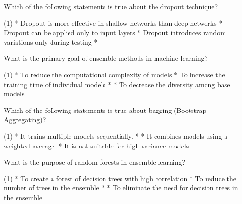\documentclass[11pt]{extarticle}
\begin{document}
\begin{exercise}
    Which of the following statements is true about the dropout technique?
    \begin{choice} (1)
        * Dropout is more effective in shallow networks than deep networks
        * Dropout can be applied only to input layers
        * Dropout introduces random variations only during testing
        * 
    \end{choice}
\end{exercise}
\begin{solution}
\end{solution}

\begin{exercise}
    What is the primary goal of ensemble methods in machine learning?
    \begin{choice}(1)
        * To reduce the computational complexity of models
        * To increase the training time of individual models
        * 
        * To decrease the diversity among base models
    \end{choice}
\end{exercise}
\begin{solution}
\end{solution}

\begin{exercise}
    Which of the following statements is true about bagging (Bootstrap Aggregating)?
    \begin{choice} (1)
        * It trains multiple models sequentially.
        * 
        * It combines models using a weighted average.
        * It is not suitable for high-variance models.
    \end{choice}
\end{exercise}
\begin{solution}
\end{solution}

\begin{exercise}
    What is the purpose of random forests in ensemble learning?
    \begin{choice}(1)
        * To create a forest of decision trees with high correlation
        * To reduce the number of trees in the ensemble
        * 
        * To eliminate the need for decision trees in the ensemble
    \end{choice}
\end{exercise}
\begin{solution}
\end{solution}
\end{document}
